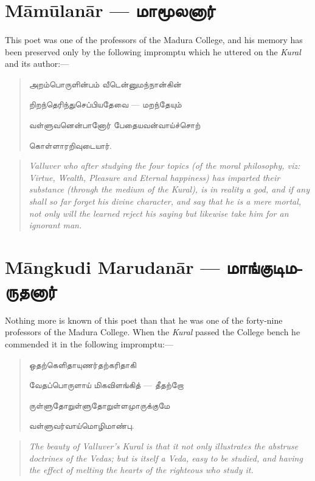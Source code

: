 \documentclass{article}
\newcommand{\TamilText}[1]{\texttamil{#1}}
\newcommand{\TamilBold}[1]{\texttamil{\textbf{#1}}}
\newcommand{\tam}[1]{\TamilText{#1}}
\newcommand{\tambold}[1]{\TamilBold{#1}}
\begin{document}
\section{M\={a}m\={u}lan\={a}r --- \tambold{மாமூலனார்}}
\paragraph{}
This poet was one of the professors of the Madura College, and his memory has been preserved only by the following impromptu which he uttered on the \emph{Kural} and its author:---
\begin{quotation}\small
\tam{அறம்பொருளின்பம்‌ வீடென்னுமந்நான்கின்‌}

\tam{றிறந்தெரிந்துசெப்பியதேவை} --- \tam{மறந்தேயும்‌}

\tam{வள்ளுவனென்பானோர்‌ பேதையவன்வாய்ச்சொற்‌}

\tam{கொள்ளாரறிவுடையார்‌}.
\end{quotation}
\begin{quotation}\small
\emph{Valluver who after studying the four topics (of the moral philosophy, viz: Virtue, Wealth, Pleasure and Eternal happiness) has imparted their substance (through the medium of the Kural), is in reality a god, and if any shall so far forget his divine character, and say that he is a mere mortal, not only will the learned reject his saying but likewise take him for an ignorant man.}
\end{quotation}

\section{M\={a}ngkudi Marudan\={a}r --- \tambold{மாங்குடிமருதனார்}}
\paragraph{}
Nothing more is known of this poet than that he was one of the forty-nine professors of the Madura College. When the \emph{Kural} passed the College bench he commended it in the following impromptu:---
\begin{quotation}\small
\tam{ஒதற்கெளிதாயுணர்தற்கரிதாகி}

\tam{வேதப்பொருளாய்‌ மிகவிளங்கித்} --- \tam{தீதற்றோ}

\tam{ருள்ளுதோறுள்ளுதோறுள்ளமுாருக்குமே}

\tam{வள்ளுவர்வாய்மொழிமாண்பு}.
\end{quotation}
\begin{quotation}\small
\emph{The beauty of Valluver's Kural is that it not only illustrates the abstruse doctrines of the Vedas; but is itself a Veda, easy to be studied, and having the effect of melting the hearts of the righteous who study it.}
\end{quotation}
\end{document}
